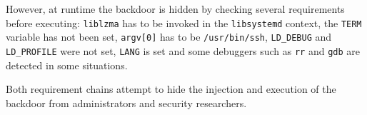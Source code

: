 However, at runtime the backdoor is hidden by checking several requirements
before executing: \texttt{liblzma} has to be invoked in the
\texttt{libsystemd} context, the \texttt{TERM} variable has not been set,
\texttt{argv[0]} has to be \texttt{/usr/bin/ssh}, \texttt{LD\_DEBUG} and
\texttt{LD\_PROFILE} were not set, \texttt{LANG} is set and some debuggers
such as \texttt{rr} and \texttt{gdb} are detected in some situations.

Both requirement chains attempt to hide the injection and execution of the
backdoor from administrators and security researchers.
